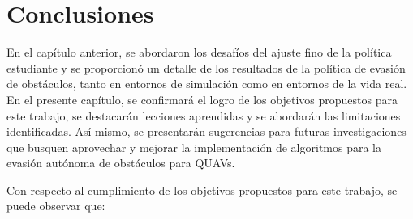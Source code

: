 \chapter{Conclusiones}
\label{capitulo7}

En el capítulo anterior, se abordaron los desafíos del ajuste fino de la política estudiante y se proporcionó un detalle de los resultados de la política de evasión de obstáculos, tanto en entornos de simulación como en entornos de la vida real. En el presente capítulo, se confirmará el logro de los objetivos propuestos para este trabajo, se destacarán lecciones aprendidas y se abordarán las limitaciones identificadas. Así mismo, se presentarán sugerencias para futuras investigaciones que busquen aprovechar y mejorar la implementación de algoritmos para la evasión autónoma de obstáculos para QUAVs.

Con respecto al cumplimiento de los objetivos propuestos para este trabajo, se puede observar que: 

